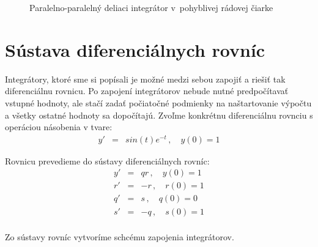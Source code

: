 \begin{figure}[h]
\centering
{}
\caption{Paralelno-paralelný deliaci integrátor v~pohyblivej rádovej čiarke}
\label{ppdi_fp}
\end{figure}
\bigskip

\section{Sústava diferenciálnych rovníc}
Integrátory, ktoré sme si popísali je možné medzi sebou zapojiť a riešiť tak diferenciálnu rovnicu. Po zapojení integrátorov nebude nutné predpočítavať vstupné hodnoty, ale stačí zadať počiatočné podmienky na naštartovanie výpočtu a všetky ostatné hodnoty sa dopočítajú.
Zvoľme konkrétnu diferenciálnu rovnciu s operáciou násobenia v tvare:
\begin{eqnarray}
y' & = & sin(t) e^{-t} \, , \quad y(0) = 1 \label{dif_sint_et}
\end{eqnarray}
\bigskip

Rovnicu prevedieme do sústavy diferenciálnych rovníc:
\begin{eqnarray}
y' & = & qr \, , \quad y(0) = 1 \nonumber \\
r' & = & -r \, , \quad r(0) = 1 \nonumber \\
q' & = & s \, , \quad q(0) = 0 \nonumber \\
s' & = & -q \, , \quad s(0) = 1 \nonumber \\
\end{eqnarray}

Zo sústavy rovníc vytvoríme schcému zapojenia integrátorov.


